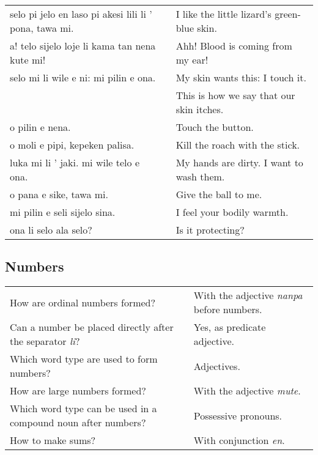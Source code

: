 \begin{supertabular}{p{5,5cm}|ll}
    selo pi jelo en laso pi akesi lili li ' pona, tawa mi. &  & I like the little lizard's green-blue skin. \\ %
    a! telo sijelo loje li kama tan nena kute mi!          &  & Ahh! Blood is coming from my ear!           \\
    selo mi li wile e ni: mi pilin e ona.                  &  & My skin wants this: I touch it.             \\
                                                           &  & This is how we say that our skin itches.    \\  %
    o pilin e nena.                                        &  & Touch the button.                           \\
    o moli e pipi, kepeken palisa.                         &  & Kill the roach with the stick.              \\
    luka mi li ' jaki. mi wile telo e ona.                 &  & My hands are dirty. I want to wash them.    \\
    o pana e sike, tawa mi.                                &  & Give the ball to me.                        \\
    mi pilin e seli sijelo sina.                           &  & I feel your bodily warmth.                  \\
    ona li selo ala selo?                                  &  & Is it protecting?                           \\
\end{supertabular}

\newpage
%
\subsection*{Numbers}
\label{'numbers'}
%
\begin{supertabular}{p{5,5cm}|ll}
    How are ordinal numbers formed?                                  &  & With the adjective \textit{nanpa} before numbers. \\ %
    Can a number be placed directly after the separator \textit{li}? &  & Yes, as predicate adjective.                      \\ %
    Which word type are used to form numbers?                        &  & Adjectives.                                       \\ %
    How are large numbers formed?                                    &  & With the adjective \textit{mute}.                 \\ %
    Which word type can be used in a compound noun after numbers?    &  & Possessive pronouns.                              \\ %
    How to make sums?                                                &  & With conjunction \textit{en}.                     \\ %
\end{supertabular}

